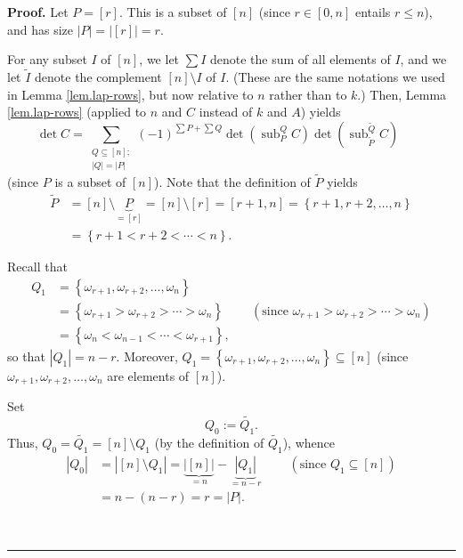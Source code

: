 \documentclass[numbers=enddot,12pt,final,onecolumn,notitlepage]{scrartcl}%
\theoremstyle{definition}
\newenvironment{proof}[1][Proof]{\noindent\textbf{#1.} }{\ \rule{0.5em}{0.5em}}
\let\sumnonlimits\sum
\renewcommand{\sum}{\sumnonlimits\limits}
\begin{document}
\begin{enumerate}
\begin{proof}
Let $P=\left[  r\right]  $. This is a subset of $\left[  n\right]  $ (since
$r\in\left[  0,n\right]  $ entails $r\leq n$), and has size $\left\vert
P\right\vert =\left\vert \left[  r\right]  \right\vert =r$.

For any subset $I$ of $\left[  n\right]  $, we let $\sum I$ denote the sum of
all elements of $I$, and we let $\widetilde{I}$ denote the complement $\left[
n\right]  \setminus I$ of $I$. (These are the same notations we used in Lemma
\ref{lem.lap-rows}, but now relative to $n$ rather than to $k$.) Then, Lemma
\ref{lem.lap-rows} (applied to $n$ and $C$ instead of $k$ and $A$) yields%
\begin{equation}
\det C=\sum_{\substack{Q\subseteq\left[  n\right]  ;\\\left\vert Q\right\vert
=\left\vert P\right\vert }}\left(  -1\right)  ^{\sum P+\sum Q}\det\left(
\operatorname*{sub}\nolimits_{P}^{Q}C\right)  \det\left(  \operatorname*{sub}%
\nolimits_{\widetilde{P}}^{\widetilde{Q}}C\right)
\ \ \ \ \ \ \ \ \ \ \label{pf.lem.p37.det2.detC=}%
\end{equation}
(since $P$ is a subset of $\left[  n\right]  $). Note that the definition of
$\widetilde{P}$ yields%
\begin{align*}
\widetilde{P}  &  =\left[  n\right]  \setminus\underbrace{P}_{=\left[
r\right]  }=\left[  n\right]  \setminus\left[  r\right]  =\left[
r+1,n\right]  =\left\{  r+1,r+2,\ldots,n\right\} \\
&  =\left\{  r+1<r+2<\cdots<n\right\}  .
\end{align*}


Recall that%
\begin{align*}
Q_{1}  &  =\left\{  \omega_{r+1},\omega_{r+2},\ldots,\omega_{n}\right\} \\
&  =\left\{  \omega_{r+1}>\omega_{r+2}>\cdots>\omega_{n}\right\}
\ \ \ \ \ \ \ \ \ \ \left(  \text{since }\omega_{r+1}>\omega_{r+2}%
>\cdots>\omega_{n}\right) \\
&  =\left\{  \omega_{n}<\omega_{n-1}<\cdots<\omega_{r+1}\right\}  ,
\end{align*}
so that $\left\vert Q_{1}\right\vert =n-r$. Moreover, $Q_{1}=\left\{
\omega_{r+1},\omega_{r+2},\ldots,\omega_{n}\right\}  \subseteq\left[
n\right]  $ (since $\omega_{r+1},\omega_{r+2},\ldots,\omega_{n}$ are elements
of $\left[  n\right]  $).

Set%
\[
Q_{0}:=\widetilde{Q_{1}}.
\]
Thus, $Q_{0}=\widetilde{Q_{1}}=\left[  n\right]  \setminus Q_{1}$ (by the
definition of $\widetilde{Q_{1}}$), whence
\begin{align*}
\left\vert Q_{0}\right\vert  &  =\left\vert \left[  n\right]  \setminus
Q_{1}\right\vert =\underbrace{\left\vert \left[  n\right]  \right\vert }%
_{=n}-\underbrace{\left\vert Q_{1}\right\vert }_{=n-r}%
\ \ \ \ \ \ \ \ \ \ \left(  \text{since }Q_{1}\subseteq\left[  n\right]
\right) \\
&  =n-\left(  n-r\right)  =r=\left\vert P\right\vert .
\end{align*}



\end{proof}
\end{enumerate}
\end{document}
